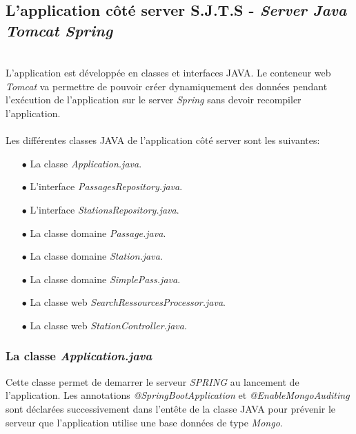 \documentclass[12pt,fleqn]{book} %
\begin{document}
\subsection{L'application côté server S.J.T.S - \emph{Server Java Tomcat Spring}}
~\\\indent L'application est développée en classes et interfaces JAVA. Le conteneur web \emph{Tomcat} va permettre de pouvoir créer dynamiquement des données pendant l'exécution de l'application sur le server \emph{Spring} sans devoir recompiler l'application. 
~\\\\Les différentes classes JAVA de l'application côté server sont les suivantes:
~\\
\begin{itemize}
 \item[$\bullet$] La classe \emph{Application.java}.
 \item[$\bullet$] L'interface \emph{PassagesRepository.java}.
 \item[$\bullet$] L'interface \emph{StationsRepository.java}.
 \item[$\bullet$] La classe domaine \emph{Passage.java}.
 \item[$\bullet$] La classe domaine \emph{Station.java}.
 \item[$\bullet$] La classe domaine \emph{SimplePass.java}.
 \item[$\bullet$] La classe web \emph{SearchRessourcesProcessor.java}.
 \item[$\bullet$] La classe web \emph{StationController.java}.
\end{itemize}
\subsubsection{La classe \emph{Application.java}}
\noindent Cette classe permet de demarrer le serveur \emph{SPRING} au lancement de l'application. Les annotations \emph{@SpringBootApplication} et \emph{@EnableMongoAuditing} sont déclarées successivement dans l'entête de la classe JAVA pour prévenir le serveur que l'application utilise une base données de type \emph{Mongo}.
\end{document}
